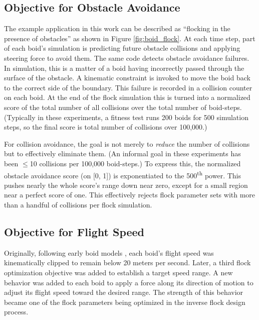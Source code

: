 \documentclass[letterpaper]{article}
\begin{document}
\subsection{Objective for Obstacle Avoidance}
\label{subsec:avoidance_objective}

The example application in this work can be described as ``flocking in the presence of obstacles'' as shown in Figure \ref{fig:boid_flock}. At each time step, part of each boid's simulation is predicting future obstacle collisions and applying steering force to avoid them. The same code detects obstacle avoidance failures. In simulation, this is a matter of a boid having incorrectly passed through the surface of the obstacle. A kinematic constraint is invoked to move the boid back to the correct side of the boundary. This failure is recorded in a collision counter on each boid. At the end of the flock simulation this is turned into a normalized score of the total number of all collisions over the total number of boid-steps. (Typically in these experiments, a fitness test runs 200 boids for 500 simulation steps, so the final score is total number of collisions over 100,000.) 

For collision avoidance, the goal is not merely to \textit{reduce} the number of collisions but to effectively eliminate them. (An informal goal in these experiments has been {$\leq$}10 collisions per 100,000 boid-steps.) To express this, the normalized obstacle avoidance score (on [0, 1]) is exponentiated to the 500\textsuperscript{th} power. This pushes nearly the whole score's range down near zero, except for a small region near a perfect score of one. This effectively rejects flock parameter sets with more than a handful of collisions per flock simulation.

\subsection{Objective for Flight Speed}
\label{subsec:speed_objective}

Originally, following early boid models \citep{reynolds_flocks_1987}, each boid's flight speed was kinematically clipped to remain below 20 meters per second. Later, a third flock optimization objective was added to establish a target speed range. A new behavior was added to each boid to apply a force along its direction of motion to adjust its flight speed toward the desired range. The strength of this behavior became one of the flock parameters being optimized in the inverse flock design process.
\end{document}
